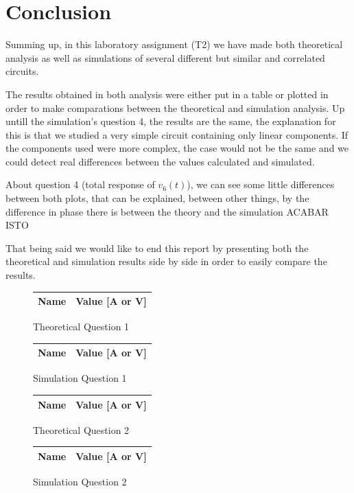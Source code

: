\section{Conclusion}
\label{sec:conclusion}

Summing up, in this laboratory assignment (T2) we have made both theoretical analysis as well as simulations of several different but similar and correlated circuits. \par
The results obtained in both analysis were either put in a table or plotted in order to make comparations between the theoretical and simulation analysis.
Up untill the simulation's question 4, the results are the same, the explanation for this is that we studied a very simple circuit containing only linear components. If the components used were more complex, the case would not be the same and we could detect real differences between the values calculated and simulated. \par
About question 4 (total response of $v_6(t)$), we can see some little differences between both plots, that can be explained, between other things, by the difference in phase there is between the theory and the simulation ACABAR ISTO \par
That being said we would like to end this report by presenting both the theoretical and simulation results side by side in order to easily compare the results.


\begin{figure}[H]
      \centering
      \begin{tabular}{ | c | c | }
      \hline    
      {\bf Name} & {\bf Value [A or V]} \\ \hline
      
      \hline
      \end{tabular}
      \caption{Theoretical Question 1}
    \endminipage\hfill
      \centering
      \begin{tabular}{ | c | c | }
      \hline    
      {\bf Name} & {\bf Value [A or V]} \\ \hline
      
      \end{tabular}
      \caption{Simulation Question 1}
    \endminipage\hfill
\end{figure}

\begin{figure}[H]
      \centering
      \begin{tabular}{ | c | c | }
      \hline    
      {\bf Name} & {\bf Value [A or V]} \\ \hline
      
      \hline
      \end{tabular}
      \caption{Theoretical Question 2}
    \endminipage\hfill
      \centering
      \begin{tabular}{ | c | c | }
      \hline    
      {\bf Name} & {\bf Value [A or V]} \\ \hline
      
      \end{tabular}
      \caption{Simulation Question 2}
    \endminipage\hfill
\end{figure}

